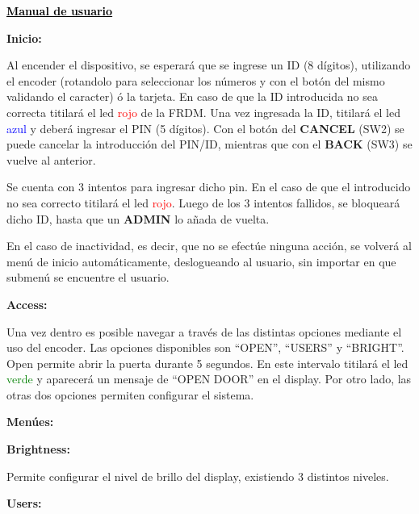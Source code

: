 \begin{center}
\textcolor{black}{\huge{\textbf{\underline{Manual de usuario}}}}
\end{center}

\begin{center}
\textbf{\LARGE{Inicio:}}
\end{center}

Al encender el dispositivo, se esperará que se ingrese un ID (8 dígitos), utilizando el encoder (rotandolo para seleccionar los números y con el botón del mismo validando el caracter) ó la tarjeta. En caso de que la ID introducida no sea correcta titilará el led \textcolor{red}{rojo} de la FRDM. Una vez ingresada la ID, titilará el led \textcolor{blue}{azul} y deberá ingresar el PIN (5 dígitos). Con el botón del \textbf{CANCEL} (SW2) se puede cancelar la introducción del PIN/ID, mientras que con el \textbf{BACK} (SW3) se vuelve al anterior.

Se cuenta con 3 intentos para ingresar dicho pin. En el caso de que el introducido no sea correcto titilará el led \textcolor{red}{rojo}. Luego de los 3 intentos fallidos, se bloqueará dicho ID, hasta que un \textbf{ADMIN} lo añada de vuelta.

En el caso de inactividad, es decir, que no se efectúe ninguna acción, se volverá al menú de inicio automáticamente, deslogueando al usuario, sin importar en que submenú se encuentre el usuario.

\begin{center}
\textbf{\LARGE{Access:}}
\end{center}

Una vez dentro es posible navegar a través de las distintas opciones mediante el uso del encoder. Las opciones disponibles son ``OPEN'', ``USERS'' y ``BRIGHT''. Open permite abrir la puerta durante 5 segundos. En este intervalo titilará el led \textcolor{green}{verde} y aparecerá un mensaje de ``OPEN DOOR'' en el display. Por otro lado, las otras dos opciones permiten configurar el sistema.

\begin{center}
\textbf{\LARGE{Menúes:}}
\end{center}

\textbf{\Large{Brightness:}}


Permite configurar el nivel de brillo del display, existiendo 3 distintos niveles.

\vspace*{0.5cm}

\textbf{\Large{Users:}}

